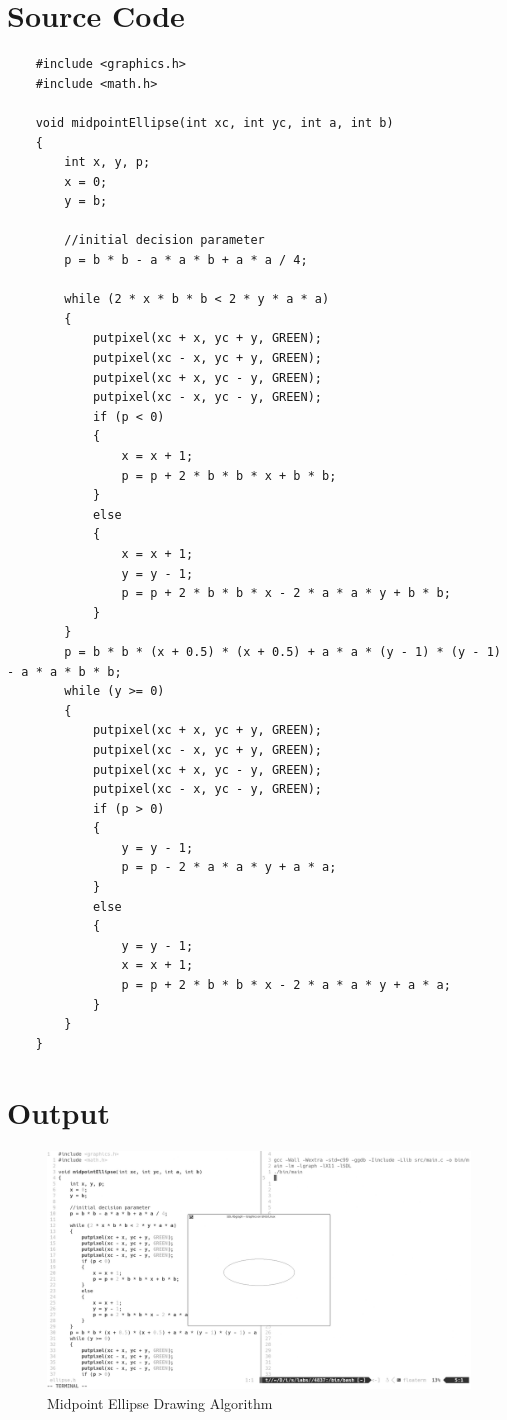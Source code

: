 \documentclass[12pt]{article}
\begin{document}
	\section{Source Code}
	\begin{verbatim}
	#include <graphics.h>
	#include <math.h>
	
	void midpointEllipse(int xc, int yc, int a, int b)
	{
	    int x, y, p;
	    x = 0;
	    y = b;
	
	    //initial decision parameter
	    p = b * b - a * a * b + a * a / 4;
	
	    while (2 * x * b * b < 2 * y * a * a)
	    {
	        putpixel(xc + x, yc + y, GREEN);
	        putpixel(xc - x, yc + y, GREEN);
	        putpixel(xc + x, yc - y, GREEN);
	        putpixel(xc - x, yc - y, GREEN);
	        if (p < 0)
	        {
	            x = x + 1;
	            p = p + 2 * b * b * x + b * b;
	        }
	        else
	        {
	            x = x + 1;
	            y = y - 1;
	            p = p + 2 * b * b * x - 2 * a * a * y + b * b;
	        }
	    }
	    p = b * b * (x + 0.5) * (x + 0.5) + a * a * (y - 1) * (y - 1) - a * a * b * b;
	    while (y >= 0)
	    {
	        putpixel(xc + x, yc + y, GREEN);
	        putpixel(xc - x, yc + y, GREEN);
	        putpixel(xc + x, yc - y, GREEN);
	        putpixel(xc - x, yc - y, GREEN);
	        if (p > 0)
	        {
	            y = y - 1;
	            p = p - 2 * a * a * y + a * a;
	        }
	        else
	        {
	            y = y - 1;
	            x = x + 1;
	            p = p + 2 * b * b * x - 2 * a * a * y + a * a;
	        }
	    }
	}

	\end{verbatim}
	\section{Output}

	\begin{figure}[!h]
		\hspace*{-1cm}
		\centering
		\includegraphics[width=1.01\linewidth]{output3.png}
		\caption{Midpoint Ellipse Drawing Algorithm}
		\label{fig:}
	\end{figure}
\end{document}
